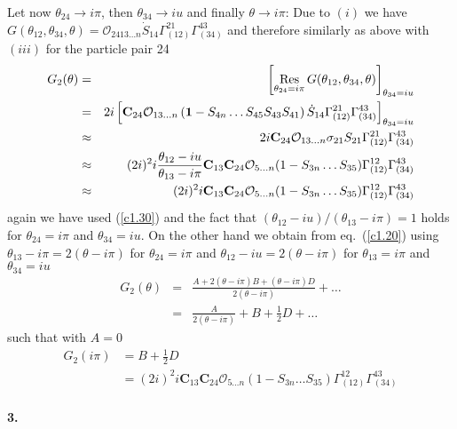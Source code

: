 \documentclass[a4paper,a4paper]{article}
\begin{document}
Let now $\theta _{24}\rightarrow i\pi $, then $\theta _{34}\rightarrow iu$
and finally $\theta \rightarrow i\pi $:\newline
Due to $(i)$ we have $G(\theta _{12},\theta _{34},\theta )=\mathcal{O}%
_{2413\dots n}\dot{S}_{14}\Gamma _{(12)}^{21}\Gamma _{(34)}^{43}$ and
therefore similarly as above with $(iii)$ for the particle pair 24 
\begin{eqnarray*}
G_{2}(\theta ) &=&\left[ \mathop{\rm Res}_{\theta _{24}=i\pi }G(\theta
_{12},\theta _{34},\theta )\right] _{\theta _{34}=iu} \\
&=&2i\left[ \mathbf{C}_{24}\mathcal{O}_{13\dots n}\left( \mathbf{1}%
-S_{4n}\dots S_{45}S_{43}S_{41}\right) \dot{S}_{14}\Gamma _{(12)}^{21}\Gamma
_{(34)}^{43}\right] _{\theta _{34}=iu} \\
&\approx &2i\mathbf{C}_{24}\mathcal{O}_{13\dots n}\sigma _{21}S_{21}\Gamma
_{(12)}^{21}\Gamma _{(34)}^{43} \\
&\approx &(2i)^{2}i\frac{\theta _{12}-iu}{\theta _{13}-i\pi }\mathbf{C}_{13}%
\mathbf{C}_{24}\mathcal{O}_{5\dots n}(1-S_{3n}\dots S_{35})\Gamma
_{(12)}^{12}\Gamma _{(34)}^{43} \\
&\approx &(2i)^{2}i\mathbf{C}_{13}\mathbf{C}_{24}\mathcal{O}_{5\dots
n}(1-S_{3n}\dots S_{35})\Gamma _{(12)}^{12}\Gamma _{(34)}^{43}
\end{eqnarray*}
again we have used (\ref{c1.30}) and the fact that $(\theta
_{12}-iu)/(\theta _{13}-i\pi )=1$ holds for $\theta _{24}=i\pi $ and $\theta
_{34}=iu$. On the other hand we obtain from eq.~(\ref{c1.20}) using $\theta
_{13}-i\pi =2(\theta -i\pi )$ for $\theta _{24}=i\pi $ and $\theta
_{12}-iu=2(\theta -i\pi )$ for $\theta _{13}=i\pi $ and $\theta _{34}=iu$ 
\begin{eqnarray*}
G_{2}(\theta ) &=&\frac{A+2(\theta -i\pi )B+(\theta -i\pi )D}{2(\theta -i\pi
)}+\dots \\
&=&\frac{A}{2(\theta -i\pi )}+B+\tfrac{1}{2}D+\dots
\end{eqnarray*}
such that with $A=0$ 
\begin{align*}
G_{2}(i\pi )& =B+\tfrac{1}{2}D \\
& =(2i)^{2}i\mathbf{C}_{13}\mathbf{C}_{24}\mathcal{O}_{5\dots
n}(1-S_{3n}\dots S_{35})\Gamma _{(12)}^{12}\Gamma _{(34)}^{43}
\end{align*}

\paragraph{3.}
\end{document}
